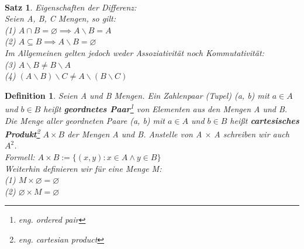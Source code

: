 \documentclass[12pt,german,a4]{article}
\begin{document}
\\

\newtheorem{satz4}[satz]{Satz}
\begin{satz4}
Eigenschaften der Differenz:\\
Seien A, B, C Mengen, so gilt:\\
(1) $A \cap B = \varnothing \implies A \backslash B = A$\\
(2) $A \subseteq B \implies A \backslash B = \varnothing$\\
Im Allgemeinen gelten jedoch weder Assoziativität noch Kommutativität:\\
(3) $A \backslash B \neq B \backslash A$\\
(4) $(A \backslash B) \backslash C \neq A \backslash (B \backslash C)$
\end{satz4}

\newtheorem{defCartProduct}[defSet]{Definition}
\begin{defCartProduct}
Seien A und B Mengen. Ein Zahlenpaar (Tupel) (a, b) mit $a \in A$ und $b \in B$ heißt {\bf geordnetes Paar}\footnote{eng. ordered pair} von Elementen aus den Mengen A und B.\\

Die Menge aller geordneten Paare (a, b) mit $a \in A$ und $b \in B$  heißt {\bf cartesisches Produkt}\footnote{eng. cartesian product} $A \times B$ der Mengen A und B. Anstelle von A $\times$ A schreiben wir auch $A^{2}$. \\
Formell: $A \times B := \{(x, y): x \in A \wedge y \in B\}$\\

Weiterhin definieren wir für eine Menge M:\\
(1) $M \times \varnothing = \varnothing$\\
(2) $\varnothing \times M = \varnothing$
\end{defCartProduct}
\end{document}
